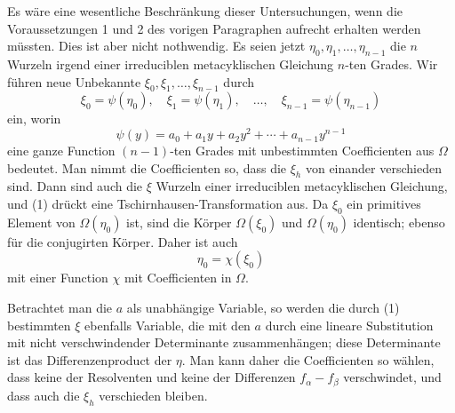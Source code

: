\documentclass[11pt]{article}
\begin{document}
Es w\"are eine wesentliche Beschr\"ankung dieser Untersuchungen, wenn die Voraussetzungen 1 und 2 des vorigen Paragraphen aufrecht erhalten werden m\"ussten. Dies ist aber nicht nothwendig. Es seien jetzt $\eta_0,\eta_1,\ldots,\eta_{n-1}$ die $n$ Wurzeln irgend einer irreduciblen metacyklischen Gleichung $n$-ten Grades. Wir f\"uhren neue Unbekannte $\xi_0,\xi_1,\ldots,\xi_{n-1}$ durch
\begin{equation}\tag{1}
  \xi_0=\psi(\eta_0),\quad \xi_1=\psi(\eta_1),\quad\ldots,\quad
  \xi_{n-1}=\psi(\eta_{n-1})
\end{equation}
ein, worin
\begin{equation}\tag{2}
  \psi(y)=a_0+a_1y+a_2y^2+\cdots+a_{n-1}y^{n-1}
\end{equation}
eine ganze Function $(n-1)$-ten Grades mit unbestimmten Coefficienten aus $\Omega$ bedeutet. Man nimmt die Coefficienten so, dass die $\xi_h$ von einander verschieden sind. Dann sind auch die $\xi$ Wurzeln einer irreduciblen metacyklischen Gleichung, und (1) dr\"uckt eine Tschirnhausen-Transformation aus. Da $\xi_0$ ein primitives Element von $\Omega(\eta_0)$ ist, sind die K\"orper $\Omega(\xi_0)$ und $\Omega(\eta_0)$ identisch; ebenso f\"ur die conjugirten K\"orper. Daher ist auch
\begin{equation}\tag{3}
  \eta_0=\chi(\xi_0)
\end{equation}
mit einer Function $\chi$ mit Coefficienten in $\Omega$.

Betrachtet man die $a$ als unabh\"angige Variable, so werden die durch (1) bestimmten $\xi$ ebenfalls Variable, die mit den $a$ durch eine lineare Substitution mit nicht verschwindender Determinante zusammenh\"angen; diese Determinante ist das Differenzenproduct der $\eta$. Man kann daher die Coefficienten so w\"ahlen, dass keine der Resolventen und keine der Differenzen $f_\alpha-f_\beta$ verschwindet, und dass auch die $\xi_h$ verschieden bleiben.
\end{document}
